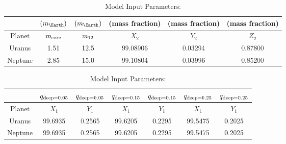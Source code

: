 \documentclass[11pt]{ucscthesisbs}
\begin{document}
\begin{table}[]
\begin{tabular}{cccccc}
                              & $(m_{\Earth})$                      & $(m_{\Earth})$                    & (mass fraction)               & (mass fraction)              & (mass fraction)              \\ \hline
\multicolumn{1}{|c|}{Planet}  & \multicolumn{1}{c|}{$m_{\rm core}$} & \multicolumn{1}{c|}{$m_{\rm 12}$} & \multicolumn{1}{c|}{$X_{2}$}  & \multicolumn{1}{c|}{$Y_{2}$} & \multicolumn{1}{c|}{$Z_{2}$} \\ \hline
\multicolumn{1}{|c|}{Uranus}  & \multicolumn{1}{c|}{1.51}           & \multicolumn{1}{c|}{12.5}         & \multicolumn{1}{c|}{99.08906} & \multicolumn{1}{c|}{0.03294} & \multicolumn{1}{c|}{0.87800} \\ \hline
\multicolumn{1}{|c|}{Neptune} & \multicolumn{1}{c|}{2.85}           & \multicolumn{1}{c|}{15.0}         & \multicolumn{1}{c|}{99.10804} & \multicolumn{1}{c|}{0.03996} & \multicolumn{1}{c|}{0.85200} \\ \hline
\end{tabular}
\caption{Model Input Parameters: }
\label{tab:core_mass_and_inner_envelope_mass_fractions}
\end{table}

\begin{table}[]
\begin{tabular}{ccccccc}
                              & $q_{\rm deep = 0.05}$        & $q_{\rm deep = 0.05}$        & $q_{\rm deep = 0.15}$        & $q_{\rm deep = 0.15}$        & $q_{\rm deep = 0.25}$        & $q_{\rm deep = 0.25}$        \\ \hline
\multicolumn{1}{|c|}{Planet}  & \multicolumn{1}{c|}{$X_{1}$} & \multicolumn{1}{c|}{$Y_{1}$} & \multicolumn{1}{c|}{$X_{1}$} & \multicolumn{1}{c|}{$Y_{1}$} & \multicolumn{1}{c|}{$X_{1}$} & \multicolumn{1}{c|}{$Y_{1}$} \\ \hline
\multicolumn{1}{|c|}{Uranus}  & \multicolumn{1}{c|}{99.6935} & \multicolumn{1}{c|}{0.2565}  & \multicolumn{1}{c|}{99.6205} & \multicolumn{1}{c|}{0.2295}  & \multicolumn{1}{c|}{99.5475} & \multicolumn{1}{c|}{0.2025}  \\ \hline
\multicolumn{1}{|c|}{Neptune} & \multicolumn{1}{c|}{99.6935} & \multicolumn{1}{c|}{0.2565}  & \multicolumn{1}{c|}{99.6205} & \multicolumn{1}{c|}{0.2295}  & \multicolumn{1}{c|}{99.5475} & \multicolumn{1}{c|}{0.2025}  \\ \hline
\end{tabular}
\caption{Model Input Parameters: }
\label{tab:outer_envelope_mass_fractions}
\end{table}
\end{document}
